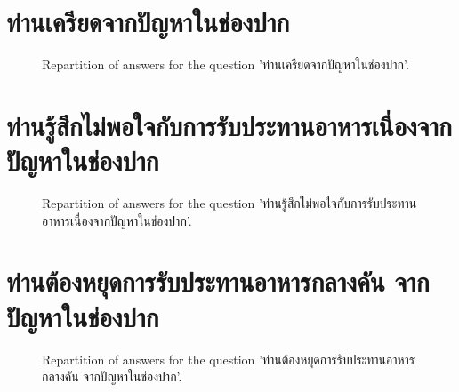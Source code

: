 \documentclass[12pt]{article}
\begin{document}
\clearpage{}
\section{ท่านเครียดจากปัญหาในช่องปาก}

\label{sec:135}


\begin{figure}[h!]
    \caption{\label{figure:q135-1}Repartition of answers for the question 'ท่านเครียดจากปัญหาในช่องปาก'.}
\end{figure}



\clearpage{}
\section{ท่านรู้สึกไม่พอใจกับการรับประทานอาหารเนื่องจากปัญหาในช่องปาก}

\label{sec:136}


\begin{figure}[h!]
    \caption{\label{figure:q136-1}Repartition of answers for the question 'ท่านรู้สึกไม่พอใจกับการรับประทานอาหารเนื่องจากปัญหาในช่องปาก'.}
\end{figure}



\clearpage{}
\section{ท่านต้องหยุดการรับประทานอาหารกลางคัน จากปัญหาในช่องปาก}

\label{sec:137}


\begin{figure}[h!]
    \caption{\label{figure:q137-1}Repartition of answers for the question 'ท่านต้องหยุดการรับประทานอาหารกลางคัน จากปัญหาในช่องปาก'.}
\end{figure}
\end{document}
